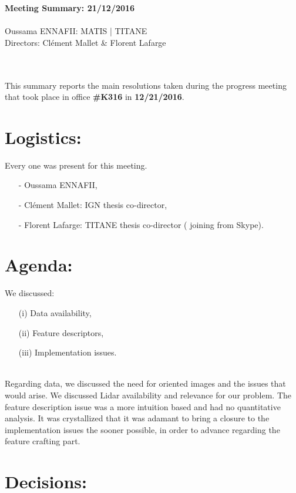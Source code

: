 \documentclass[a4paper, 11pt]{article}
\begin{document}
	\begin{centering}
		\large\textbf{Meeting Summary: 21/12/2016}\\
		~\\
		Oussama ENNAFII:
		\normalsize MATIS | TITANE \\
		Directors: Cl\'ement Mallet \& Florent Lafarge \\
	\end{centering}
	
	~\\~\\
	This summary reports the main resolutions taken during the progress meeting that took place in office \textbf{\#K316} in \textbf{12/21/2016}.
	\section*{Logistics:}
	Every one was present for this meeting.
	\begin{itemize}
		\item[-] Oussama ENNAFII,
		\item[-] Cl\'ement Mallet: IGN thesis co-director,
		\item[-] Florent Lafarge: TITANE thesis co-director ( joining from Skype).
	\end{itemize}
	
	\section*{Agenda:}
	
	We discussed: 
	\begin{itemize}
		\item[(i)] Data availability,
		\item[(ii)] Feature descriptors,
		\item[(iii)] Implementation issues.
	\end{itemize}
	~\\
	
	Regarding data, we discussed the need for oriented images and the issues that would arise. We discussed Lidar availability and relevance for our problem. The feature description issue was a more intuition based and had no quantitative analysis. It was crystallized that it was adamant to bring a closure to the implementation issues the sooner possible, in order to advance regarding the feature crafting part.
	
	\section*{Decisions:}
	
\end{document}
